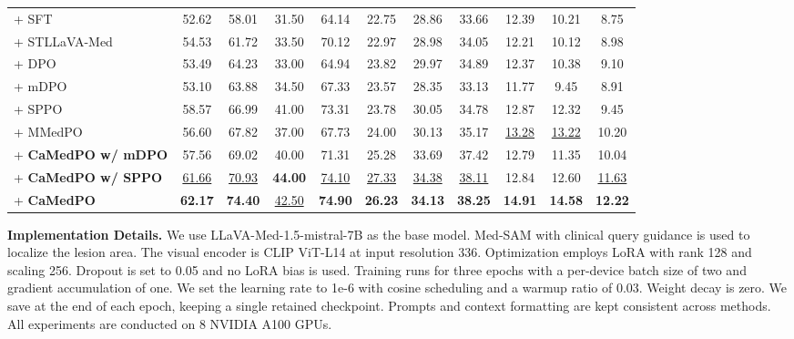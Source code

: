 \begin{table}[t]
{\begin{tabular}{lcccccccccc}
\midrule
+ SFT & 52.62 & 58.01 & 31.50 & 64.14 & 22.75 & 28.86 & 33.66 & 12.39 & 10.21 & 8.75 \\
\quad+ STLLaVA-Med & 54.53 & 61.72 & 33.50 & 70.12 & 22.97 & 28.98 & 34.05 & 12.21 & 10.12 & 8.98 \\
\quad + DPO & 53.49 & 64.23 & 33.00 & 64.94 & 23.82 & 29.97 & 34.89 & 12.37 & 10.38 & 9.10 \\
\quad+ mDPO & 53.10 & 63.88 & 34.50 & 67.33 & 23.57 & 28.35 & 33.13 & 11.77 & 9.45 & 8.91 \\
\quad+ SPPO & 58.57 & 66.99 & 41.00 & 73.31 & 23.78 & 30.05 & 34.78 & 12.87 & 12.32 & 9.45 \\
\quad+ MMedPO & 56.60 & 67.82 & 37.00 & 67.73 & 24.00 & 30.13 & 35.17 & \underline{13.28} & \underline{13.22} & 10.20 \\
\rowcolor{cyan!7}
\quad+ \textbf{CaMedPO w/ mDPO} & 57.56 & 69.02 & 40.00 & 71.31 & 25.28 & 33.69 & 37.42 & 12.79 & 11.35 & 10.04 \\
\rowcolor{cyan!7}
\quad+ \textbf{CaMedPO w/ SPPO} & \underline{61.66} & \underline{70.93} & \textbf{44.00} & \underline{74.10} & \underline{27.33} & \underline{34.38} & \underline{38.11} & 12.84 & 12.60 & \underline{11.63} \\
\rowcolor{cyan!7}
\quad+ \textbf{CaMedPO} & \textbf{62.17} & \textbf{74.40} & \underline{42.50} & \textbf{74.90} & \textbf{26.23} & \textbf{34.13} & \textbf{38.25} & \textbf{14.91} & \textbf{14.58} & \textbf{12.22} \\
\bottomrule
\end{tabular}
}
\label{tab:main_results}
\end{table}

\noindent\textbf{Implementation Details.}
We use LLaVA-Med-1.5-mistral-7B \cite{Li2023LLaVAMed} as the base model. Med-SAM \cite{ma2024segment} with clinical query guidance is used to localize the lesion area. The visual encoder is CLIP ViT-L14 at input resolution 336. Optimization employs LoRA with rank 128 and scaling 256. Dropout is set to 0.05 and no LoRA bias is used. Training runs for three epochs with a per-device batch size of two and gradient accumulation of one. We set the learning rate to 1e-6 with cosine scheduling and a warmup ratio of 0.03. Weight decay is zero. We save at the end of each epoch, keeping a single retained checkpoint. Prompts and context formatting are kept consistent across methods. All experiments are conducted on 8 NVIDIA A100 GPUs.

